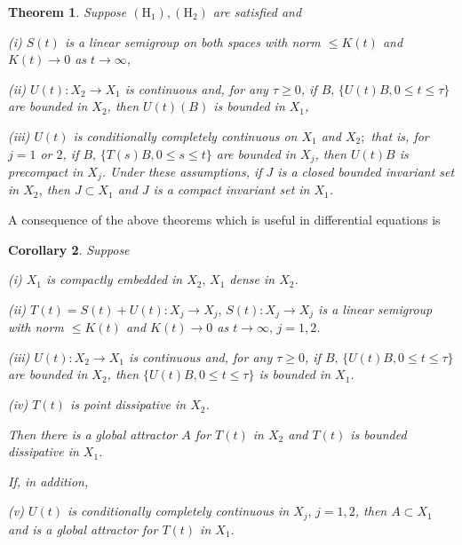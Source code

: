\documentclass{surv-l}
\theoremstyle{plain}
\newtheorem{theorem}{Theorem}[section]
\newtheorem{corollary}[theorem]{Corollary}
\theoremstyle{definition}
\numberwithin{equation}{section}
\numberwithin{figure}{chapter}
\begin{document}
\begin{theorem}\label{thm3.9.4} Suppose $(\mathrm{H}_{1}), (\mathrm{H}_{2})$ are satisfied and

\emph{(i)} $S(t)$ is a linear semigroup on both spaces with norm $\leq K(t)$ and $K(t)\rightarrow 0$ as $ t\rightarrow\infty$,

\emph{(ii)} $U(t)\!:X_{2}\rightarrow X_{1}$ is continuous and, for any $\tau\geq 0$, if $B,\, \{U(t)B, 0\leq t\leq\tau\}$ are bounded in $X_{2}$, then $U(t)(B)$ is bounded in $X_{1}$,

\emph{(iii)} $U(t)$ is conditionally completely continuous on $X_{1}$ and $X_{2};$ that is, for $j= 1$ or $2$, if $B,\, \{T(s)B, 0\leq s\leq t\}$ are bounded in $X_{j}$, then $U(t)B$ is precompact in $X_{j}$. Under these assumptions, if $J$ is a closed bounded invariant set in $X_{2}$, then $J\subset X_{1}$ and $J$ is a compact invariant set in $X_{1}$.
\end{theorem}

A consequence of the above theorems which is useful in differential equations is

\begin{corollary}\label{cor3.9.5} Suppose

\emph{(i)} $X_{1}$ is compactly embedded in $X_{2},\, X_{1}$ dense in $X_{2}$.

\emph{(ii)} $T(t)=S(t)+U(t)\!:X_{j}\rightarrow X_{j},\, S(t)\!:X_{j}\rightarrow X_{j}$ is a linear semigroup with norm $\leq K(t)$ and $K(t)\rightarrow 0$ as $ t\rightarrow\infty,\, j=1,2$.

\emph{(iii)} $U(t)\!:X_{2}\rightarrow X_{1}$ is continuous and, for any $\tau\geq 0$, if $B,\, \{U(t)B, 0\leq t\leq\tau\}$ are bounded in $X_{2}$, then $\{U(t)B, 0\leq t\leq\tau\}$ is bounded in $X_{1}$.

\emph{(iv)} $T(t)$ is point dissipative in $X_{2}$.

Then there is a global attractor $A$ for $T(t)$ in $X_{2}$ and $T(t)$ is bounded dissipative in $X_{1}$.

If, in addition,

\emph{(v)} $U(t)$ is conditionally completely continuous in $X_{j},\, j=1,2$, then $A\subset X_{1}$ and is a global attractor for $T(t)$ in $X_{1}$.
\end{corollary}
\end{document}
